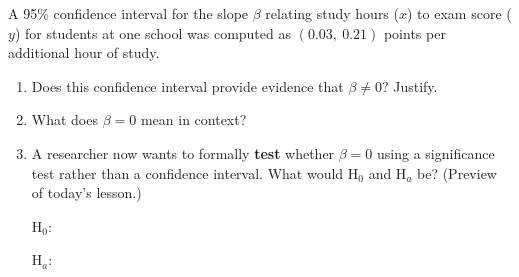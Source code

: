 \documentclass[10pt]{article}
\begin{document}
\namedateperiod

\vspace{0.15in}

A 95\% confidence interval for the slope $\beta$ relating study hours ($x$) to
exam score ($y$) for students at one school was computed as $(0.03,\ 0.21)$ points
per additional hour of study.

\begin{enumerate}

  \item Does this confidence interval provide evidence that $\beta \ne 0$? Justify.


  \item What does $\beta = 0$ mean in context?


  \item A researcher now wants to formally \textbf{test} whether $\beta = 0$ using a
        significance test rather than a confidence interval.
        What would H$_0$ and H$_a$ be? (Preview of today's lesson.)

        H$_0$: \blank{9cm}

        \vspace{0.05in}

        H$_a$: \blank{9cm}

\end{enumerate}
\end{document}
